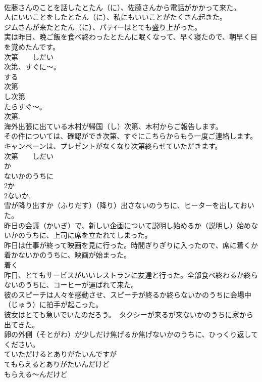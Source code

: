 \documentclass[8pt]{extreport}
\begin{document}
\begin{CJK}{UTF8}{min}
\\	佐藤さんのことを話したとたん（に）、佐藤さんから電話がかかって来た。
\\	人にいいことをしたとたん（に）、私にもいいことがたくさん起きた。
\\	ジムさんが来たとたん（に）、パテｲーはとても盛り上がった。
\\	実は昨日、晩ご飯を食べ終わったとたんに眠くなって、早く寝たので、朝早く目を覚めたんです。
\\	次第　　しだい
\\	次第、すぐに～。 
\\	する 
\\	次第 
\\	し次第 
\\	たらすぐ～。 
\\	次第.
\\	海外出張に出ている木村が帰国（し）次第、木村からご報告します。
\\	その件については、確認ができ次第、すぐにこちらからもう一度ご連絡します。
\\	キャンペーンは、プレゼントがなくなり次第終らせていただきます。
\\	次第　　しだい
\\	か
\\	ないかのうちに
\\	2か
\\	2ないか, 
\\	雪が降り出すか（ふりだす）（降り）出さないのうちに、ヒーターを出しておいた。
\\	昨日の会議（かいぎ）で、新しい企画について説明し始めるか（説明し）始めないかのうちに、上司に席を立たれてしまった。
\\	昨日は仕事が終って映画を見に行った。時間ぎりぎりに入ったので、席に着くか着かないかのうちに、映画が始まった。
\\	着く 
\\	昨日、とてもサービスがいいレストランに友達と行った。全部食べ終わるか終らないのうちに、コーヒーが運ばれて来た。
\\	彼のスピーチは人々を感動させ、スピーチが終るか終らないかのうちに会場中（じゅう）に拍手が起こった。
\\	彼女はとても急いでいたのだろう。　タクシーが来るが来ないかのうちに家から出てきた。
\\	卵の外側（そとがわ）が少しだけ焦げるか焦げないかのうちに、ひっくり返してください。	
\\	ていただけるとありがたいんですが
\\	てもらえるとありがたいんだけど
\\	もらえる～んだけど

\end{CJK}
\end{document}
